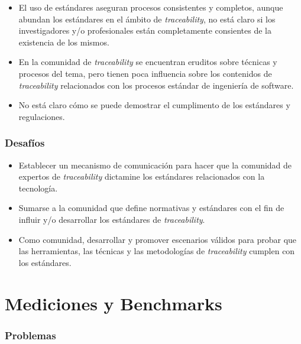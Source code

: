 \documentclass[a4paper,12pt,twoside,spanish,openright]{book}
\begin{document}
\begin{itemize}[label={$\times$}]

\item El uso de estándares aseguran procesos consistentes y completos, aunque abundan los estándares en el ámbito de \textit{traceability}, no está claro si los investigadores y/o profesionales están completamente consientes de la existencia de los mismos.

\item En la comunidad de \textit{traceability} se encuentran eruditos sobre técnicas y procesos del tema, pero tienen poca influencia sobre los contenidos de \textit{traceability} relacionados con los procesos estándar de ingeniería de software.

\item No está claro cómo se puede demostrar el cumplimento de los estándares y regulaciones.

\end{itemize}

\subsubsection{Desafíos}

\begin{itemize}[label={\checkmark}]

\item Establecer un mecanismo de comunicación para hacer que la comunidad de expertos de \textit{traceability} dictamine los estándares relacionados con la tecnología.

\item Sumarse a la comunidad que define normativas y estándares con el fin de influir y/o desarrollar los estándares de \textit{traceability}.

\item Como comunidad, desarrollar y promover escenarios válidos para probar que las herramientas, las técnicas y las metodologías de \textit{traceability} cumplen con los estándares.

\end{itemize}


\section{Mediciones y Benchmarks}

\subsubsection{Problemas}
\end{document}
